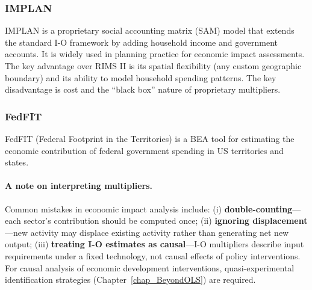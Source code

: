 \subsubsection{IMPLAN}

IMPLAN is a proprietary social accounting matrix (SAM) model that extends
the standard I-O framework by adding household income and government accounts.
It is widely used in planning practice for economic impact assessments.
The key advantage over RIMS II is its spatial flexibility (any custom
geographic boundary) and its ability to model household spending patterns.
The key disadvantage is cost and the ``black box'' nature of proprietary
multipliers.

\subsubsection{FedFIT}

FedFIT (Federal Footprint in the Territories) is a BEA tool for estimating
the economic contribution of federal government spending in US territories
and states.

\paragraph{A note on interpreting multipliers.}

Common mistakes in economic impact analysis include: (i)
\textbf{double-counting}---each sector's contribution should be computed once;
(ii) \textbf{ignoring displacement}---new activity may displace existing
activity rather than generating net new output; (iii) \textbf{treating I-O
estimates as causal}---I-O multipliers describe input requirements under a
fixed technology, not causal effects of policy interventions. For causal
analysis of economic development interventions, quasi-experimental
identification strategies (Chapter~\ref{chap_BeyondOLS}) are required.

\renewcommand\bibname{Further reading}
\begin{subappendices}


\end{subappendices}

